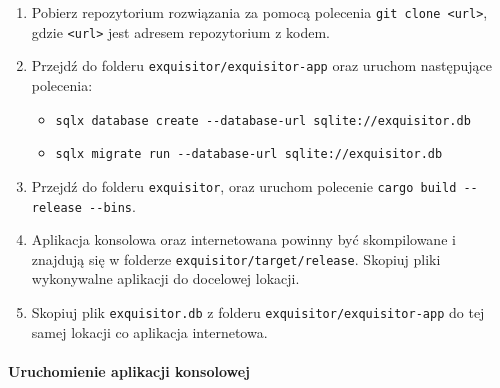                 \begin{enumerate}
                    \item {
                        Pobierz repozytorium rozwiązania za pomocą polecenia \texttt{git clone <url>}, gdzie \texttt{<url>} jest adresem repozytorium z kodem.
                    }
                    \item {
                        Przejdź do folderu \texttt{exquisitor/exquisitor-app} oraz uruchom następujące polecenia:

                        \begin{itemize}
                            \item {
                                \texttt{sqlx database create -\phantom{}-database-url sqlite://exquisitor.db}
                            }
                            \item {
                                \texttt{sqlx migrate run -\phantom{}-database-url sqlite://exquisitor.db}
                            }
                        \end{itemize}
                    }
                    \item {
                        Przejdź do folderu \texttt{exquisitor}, oraz uruchom polecenie \texttt{cargo build -\phantom{}-release -\phantom{}-bins}.
                    }
                    \item {
                        Aplikacja konsolowa oraz internetowana powinny być skompilowane i znajdują się w folderze \texttt{exquisitor/target/release}. 
                        Skopiuj pliki wykonywalne aplikacji do docelowej lokacji.
                    }
                    \item{
                        Skopiuj plik \texttt{exquisitor.db} z folderu \texttt{exquisitor/exquisitor-app} do tej samej lokacji co aplikacja internetowa.
                    }
                \end{enumerate}
            
            \paragraph{Uruchomienie aplikacji konsolowej}

